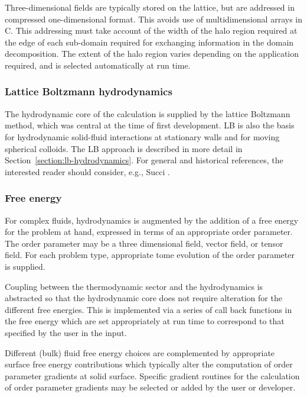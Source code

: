 Three-dimensional fields are typically stored on the lattice,
but are addressed in compressed one-dimensional format. This
avoids use of multidimensional arrays in C. This addressing
must take account of the width of the halo region required at
the edge of each sub-domain required for exchanging information
in the domain decomposition. The extent of the halo region
varies depending on the application required, and is selected
automatically at run time.

\subsubsection{Lattice Boltzmann hydrodynamics}

The hydrodynamic core of the calculation is supplied by the lattice
Boltzmann method, which was central at the time of first development.
LB is also the basis for hydrodynamic solid-fluid interactions at
stationary walls and for moving spherical colloids. The LB approach
is described in more detail in Section~\ref{section:lb-hydrodynamics}.
For general
and historical references, the interested reader should consider,
e.g., Succi \cite{succi}.

\subsubsection{Free energy}

For complex fluids, hydrodynamics is augmented by the addition of
a free energy for the problem at hand, expressed in terms of an
appropriate order parameter. The order parameter may be a three
dimensional field, vector field, or tensor field. For each problem
type, appropriate tome evolution of the order parameter is supplied.

Coupling between the thermodynamic sector and the hydrodynamics is
abstracted so that the hydrodynamic core does not require alteration
for the different free energies. This is implemented via a series of
call back functions in the free energy which are set appropriately
at run time to correspond to that specified by the user in the
input.

Different (bulk) fluid free energy choices are complemented by
appropriate surface free energy contributions which typically
alter the computation of order parameter gradients at solid
surface. Specific gradient routines for the calculation of
order parameter gradients may be selected or added by the
user or developer.


